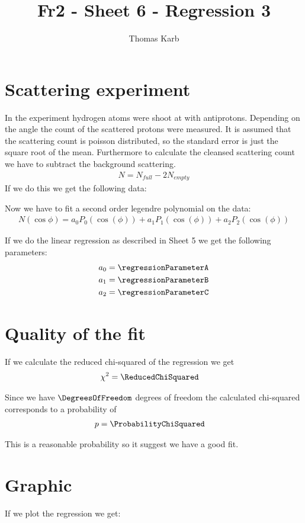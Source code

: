 \documentclass[11pt]{article}
\title{Fr2 - Sheet 6 - Regression 3}
\author{Thomas Karb}
\begin{document}
    \maketitle
    
    \section{Scattering experiment}
    
    In the experiment hydrogen atoms were shoot at with antiprotons.
    Depending on the angle the count of the scattered protons were measured.
    It is assumed that the scattering count is poisson distributed, so the standard error
    is just the square root of the mean. 
    Furthermore to calculate the cleansed scattering count we have to subtract the background scattering.
    \begin{align*}
        N = N_{full} - 2 N_{empty}
    \end{align*}
    If we do this we get the following data:
    
    
    
    Now we have to fit a second order legendre polynomial on the data:
    \begin{align*}
        N(\cos{\phi}) = a_0 P_0 (\cos(\phi)) + a_1 P_1 (\cos(\phi)) + a_2 P_2 (\cos(\phi))
    \end{align*}
    
    If we do the linear regression as described in Sheet 5 we get the following parameters:
    \begin{align*}
        a_0 &= \regressionParameterA \\
        a_1 &= \regressionParameterB \\
        a_2 &= \regressionParameterC
    \end{align*}
    
    
    \section{Quality of the fit}
    
    If we calculate the reduced chi-squared of the regression we get
    \begin{align*}
        \chi^2 &= \ReducedChiSquared
    \end{align*}
    
    Since we have $\DegreesOfFreedom$ degrees of freedom the calculated chi-squared 
    corresponds to a probability of
    \begin{align*}
        p &= \ProbabilityChiSquared
    \end{align*}
    
    This is a reasonable probability so it suggest we have a good fit. 
    
    \section{Graphic}
    
    If we plot the regression we get:
    
    
\end{document}
